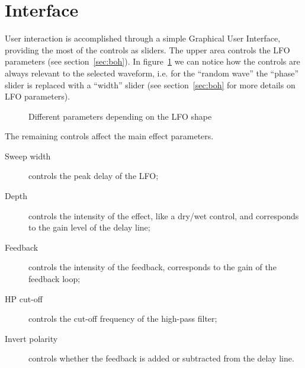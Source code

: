 \section{Interface}

User interaction is accomplished through a simple Graphical User Interface, providing the most of the controls as sliders.
The upper area controls the LFO parameters (see section~\ref{sec:boh}). In figure~\ref{fig:gui-lfo} we can notice how the controls are always relevant to the selected waveform, i.e. for the ``random wave'' the ``phase'' slider is replaced with a ``width'' slider (see section~\ref{sec:boh} for more details on LFO parameters).

\begin{figure}[H]
	\centering
	\caption{Different parameters depending on the LFO shape}
	\label{fig:gui-lfo}
\end{figure}

The remaining controls affect the main effect parameters.

\begin{description}
	\item[Sweep width] controls the peak delay of the LFO;
	\item[Depth] controls the intensity of the effect, like a dry/wet control, and corresponds to the gain level of the delay line;
	\item[Feedback] controls the intensity of the feedback, corresponds to the gain of the feedback loop;
	\item[HP cut-off] controls the cut-off frequency of the high-pass filter;
	\item[Invert polarity] controls whether the feedback is added or subtracted from the delay line.
\end{description}

